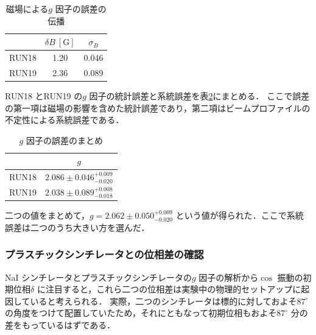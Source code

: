 \begin{table}[H]%
\caption{磁場による$g$ 因子の誤差の伝播}
\centering
\begin{tabular}{ccc}\toprule
{} & $\delta B~[\mathrm{G}]$ &  $\sigma_{B}$  \\ \midrule
RUN18 & 1.20 & 0.046  \\
RUN19 & 2.36 & 0.089 \\ \bottomrule
\end{tabular}
\label{tab:g_error}
\end{table}

RUN18 とRUN19 の$g$ 因子の統計誤差と系統誤差を表\ref{tab:NaIggosamatome}にまとめる．
ここで誤差の第一項は磁場の影響を含めた統計誤差であり，第二項はビームプロファイルの不定性による系統誤差である．

\begin{table}[H]%
\caption{$g$ 因子の誤差のまとめ}
\centering
\begingroup
\renewcommand{\arraystretch}{1.2}%
\begin{tabular}{cc}\toprule
{} &   $g$  \\ \midrule
RUN18 & $2.086 \pm 0.046^{+0.009}_{-0.020} $  \\
RUN19 & $2.038 \pm 0.089^{+0.008}_{-0.018} $  \\ \bottomrule
\end{tabular}\label{tab:NaIggosamatome}
\endgroup
\end{table}

二つの値をまとめて，$g = 2.062 \pm 0.050^{+0.009}_{-0.020}$ という値が得られた．ここで系統誤差は二つのうち大きい方を選んだ．

\subsubsection{プラスチックシンチレータとの位相差の確認}
\label{subsubsec:PhaseCheck}

NaI シンチレータとプラスチックシンチレータの$g$ 因子の解析から$\cos$ 振動の初期位相$\delta$ に注目すると，これら二つの位相差は実験中の物理的セットアップに起因していると考えられる．
実際，二つのシンチレータは標的に対しておよそ$87^{\circ}$ の角度をつけて配置していたため，それにともなって初期位相もおよそ$87^{\circ}$ 分の差をもっているはずである．

